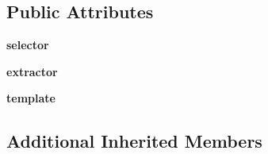\subsection*{Public Attributes}
\begin{DoxyCompactItemize}
\item 
\hypertarget{classcheshire3_1_1transformer_1_1_templated_transformer_a52d1b708d228d8309090abab5fc268fc}{{\bfseries selector}}\label{classcheshire3_1_1transformer_1_1_templated_transformer_a52d1b708d228d8309090abab5fc268fc}

\item 
\hypertarget{classcheshire3_1_1transformer_1_1_templated_transformer_a1e06ccc10f624e20c0d6643f83e76ead}{{\bfseries extractor}}\label{classcheshire3_1_1transformer_1_1_templated_transformer_a1e06ccc10f624e20c0d6643f83e76ead}

\item 
\hypertarget{classcheshire3_1_1transformer_1_1_templated_transformer_a4285bce6fc9592b665bea920310eb37a}{{\bfseries template}}\label{classcheshire3_1_1transformer_1_1_templated_transformer_a4285bce6fc9592b665bea920310eb37a}

\end{DoxyCompactItemize}
\subsection*{Additional Inherited Members}



